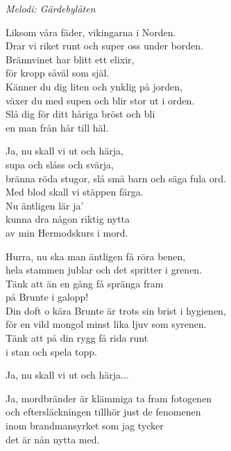 {\footnotesize\textit{Melodi: Gärdebylåten}}\par
\vspace{10pt}
Liksom våra fäder, vikingarna i Norden.\\
Drar vi riket runt och super oss under borden.\\
Brännvinet har blitt ett elixir,\\
för kropp såväl som själ.\\
Känner du dig liten och ynklig på jorden,\\
växer du med supen och blir stor ut i orden.\\
Slå dig för ditt håriga bröst och bli \\
en man från hår till häl.\par
\vspace{10pt}
Ja, nu skall vi ut och härja,\\
supa och slåss och svärja,\\
bränna röda stugor, slå små barn och säga fula ord.\\
Med blod skall vi stäppen färga.\\
Nu äntligen lär ja'\\
kunna dra någon riktig nytta\\
av min Hermodskurs i mord.\par
\vspace{10pt}
Hurra, nu ska man äntligen få röra benen,\\
hela stammen jublar och det spritter i grenen.\\
Tänk att än en gång få spränga fram\\
på Brunte i galopp!\\
Din doft o kära Brunte är trots sin brist i hygienen,\\
för en vild mongol minst lika ljuv som syrenen.\\
Tänk att på din rygg få rida runt\\
i stan och spela topp.\par
\vspace{10pt}
Ja, nu skall vi ut och härja...\par
\vspace{10pt}
Ja, mordbränder är klämmiga ta fram fotogenen\\
och eftersläckningen tillhör just de fenomenen\\
inom brandmansyrket som jag tycker\\
det är nån nytta med.\\
